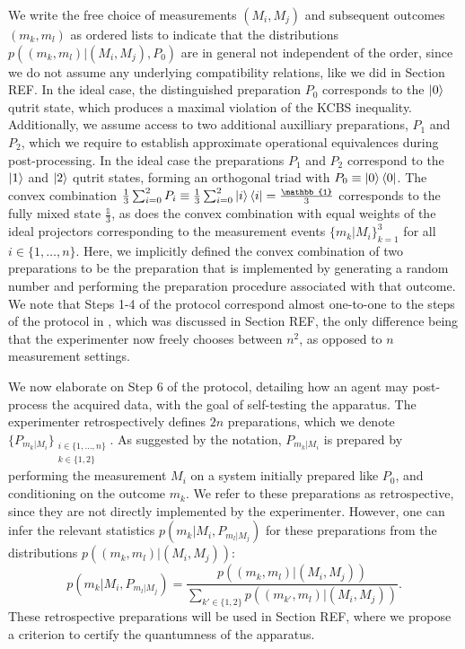 We write the free choice of measurements $(M_i,M_j)$ and subsequent outcomes $(m_k,m_l)$ as ordered lists to indicate that the distributions $p((m_k,m_l)\vert (M_i,M_j),P_0)$ are in general not independent of the order, since we do not assume any underlying compatibility relations, like we did in Section REF. In the ideal case, the distinguished preparation $P_0$ corresponds to the $\ket{0}$ qutrit state, which produces a maximal violation of the KCBS inequality. Additionally, we assume access to two additional auxilliary preparations, $P_1$ and $P_2$, which we require to establish approximate operational equivalences during post-processing. In the ideal case the preparations $P_1$ and $P_2$ correspond to the $\ket{1}$ and $\ket{2}$ qutrit states, forming an orthogonal triad with $P_0\equiv\ket{0}\bra{0}$. The convex combination $\frac{1}{3}\sum_{i=0}^2 P_i\equiv\frac{1}{3}\sum_{i=0}^2\ket{i}\bra{i}=\frac{\mathbb{1}}{3}$ corresponds to the fully mixed state $\frac{\mathbb{1}}{3}$, as does the convex combination with equal weights of the ideal projectors corresponding to the measurement events $\{m_k\vert M_i\}_{k=1}^3$ for all $i\in\{1,\dots,n\}$. Here, we implicitly defined the convex combination of two preparations to be the preparation that is implemented by generating a random number and performing the preparation procedure associated with that outcome. We note that Steps 1-4 of the protocol correspond almost one-to-one to the steps of the protocol in \cite{Bharti2019}, which was discussed in Section REF, the only difference being that the experimenter now freely chooses between $n^2$, as opposed to $n$ measurement settings.

We now elaborate on Step 6 of the protocol, detailing how an agent may post-process the acquired data, with the goal of self-testing the apparatus. The experimenter retrospectively defines $2n$ preparations, which we denote $\{P_{m_k\vert M_i}\}_{\substack{i\in\{1,\dots,n\} \\ k\in\{1,2\}}}$. As suggested by the notation, $P_{m_k\vert M_i}$ is prepared by performing the measurement $M_i$ on a system initially prepared like $P_0$, and conditioning on the outcome $m_k$. We refer to these preparations as retrospective, since they are not directly implemented by the experimenter. However, one can infer the relevant statistics $p(m_k\vert M_i, P_{m_l\vert M_j})$ for these preparations from the distributions $p((m_k,m_l)\vert (M_i,M_j))$:
\begin{equation}
p(m_k\vert M_i, P_{m_l\vert M_j})=\frac{p((m_k,m_l)\vert (M_i,M_j))}{\sum_{k'\in\{1,2\}} p((m_{k'},m_l)\vert (M_i,M_j))}.
\end{equation}
These retrospective preparations will be used in Section REF, where we propose a criterion to certify the quantumness of the apparatus.

